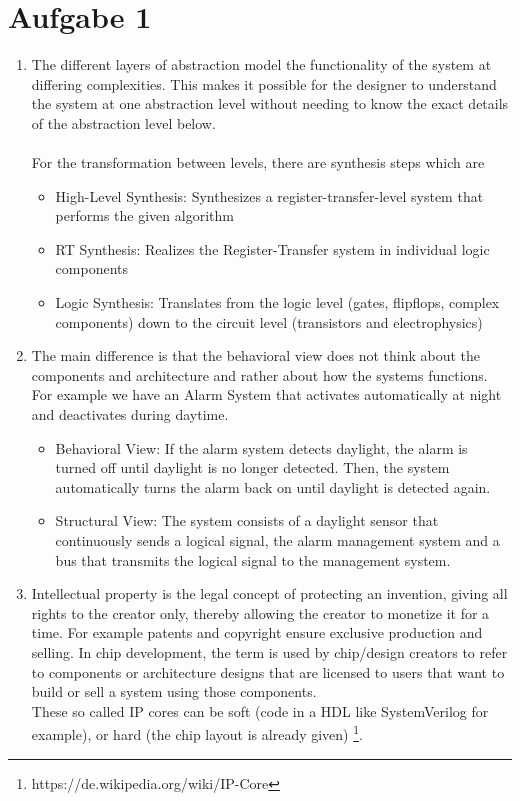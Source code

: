 \documentclass[a4paper]{scrartcl}
\begin{document}
\section*{Aufgabe 1}
\begin{enumerate}[label=(\alph*)]

    \item 
    The different layers of abstraction model the functionality of the system at differing complexities.
    This makes it possible for the designer to understand the system at one abstraction level without needing to know the exact details of the abstraction level below. 
    \\\\
    For the transformation between levels, there are synthesis steps which are
        \begin{itemize}
            \item High-Level Synthesis: Synthesizes a register-transfer-level system that performs the given algorithm 
            \item RT Synthesis: Realizes the Register-Transfer system in individual logic components
            \item Logic Synthesis: Translates from the logic level (gates, flipflops, complex components) down to the circuit level (transistors and electrophysics) 
        \end{itemize}
        
    
    \item 
    The main difference is that the behavioral view does not think about the components and architecture and rather about how the systems functions.
    For example we have an Alarm System that activates automatically at night and deactivates during daytime.
    \begin{itemize}
        \item Behavioral View: If the alarm system detects daylight, the alarm is turned off until daylight is no longer detected. Then, the system automatically turns the alarm back on until daylight is detected again.
        \item Structural View: The system consists of a daylight sensor that continuously sends a logical signal, the alarm management system and a bus that transmits the logical signal to the management system.
    \end{itemize}

    \item 
    Intellectual property is the legal concept of protecting an invention, giving all rights to the creator only, thereby allowing the creator to monetize it for a time. For example patents and copyright ensure exclusive production and selling.
    In chip development, the term is used by chip/design creators to refer to components or architecture designs that are licensed to users that want to build or sell a system using those components.\\
    These so called IP cores can be soft (code in a HDL like SystemVerilog for example), or hard (the chip layout is already given) \footnote{https://de.wikipedia.org/wiki/IP-Core}.
    


\end{enumerate}
\end{document}
